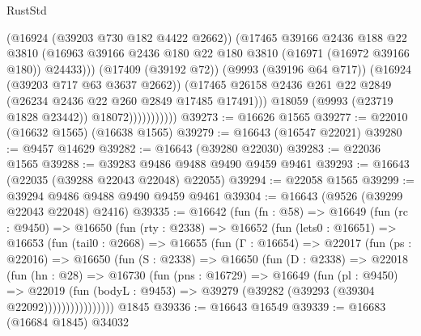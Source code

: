 \begin{lexlean}{RustStd}
\begin{coremodule}
                              (@16924 (@39203 @730 @182 @4422 @2662))
                              (@17465
                                @39166
                                @2436
                                @188
                                @22
                                @3810
                                (@16963
                                  @39166
                                  @2436
                                  @180
                                  @22
                                  @180
                                  @3810
                                  (@16971 (@16972 @39166 @180))
                                  @24433)))
                            (@17409 (@39192 @72))
                            (@9993 (@39196 @64 @717))
                            (@16924 (@39203 @717 @63 @3637 @2662))
                            (@17465
                              @26158
                              @2436
                              @261
                              @22
                              @2849
                              (@26234 @2436 @22 @260 @2849 @17485 @17491)))
                          @18059
                          (@9993 (@23719 @1828 @23442))
                          @18072)))))))))))
@39273 := @16626 @1565
@39277 := @22010 (@16632 @1565) (@16638 @1565)
@39279 := @16643 (@16547 @22021)
@39280 := @9457 @14629
@39282 := @16643 (@39280 @22030)
@39283 := @22036 @1565
@39288 := @39283 @9486 @9488 @9490 @9459 @9461
@39293 := @16643 (@22035 (@39288 @22043 @22048) @22055)
@39294 := @22058 @1565
@39299 := @39294 @9486 @9488 @9490 @9459 @9461
@39304 := @16643 (@9526 (@39299 @22043 @22048) @2416)
@39335 := @16642
    (fun (fn : @58) =>
    @16649
      (fun (rc : @9450) =>
      @16650
        (fun (rty : @2338) =>
        @16652
          (fun (lets0 : @16651) =>
          @16653
            (fun (tail0 : @2668) =>
            @16655
              (fun (Γ : @16654) =>
              @22017
                (fun (ps : @22016) =>
                @16650
                  (fun (S : @2338) =>
                  @16650
                    (fun (D : @2338) =>
                    @22018
                      (fun (hn : @28) =>
                      @16730
                        (fun (pns : @16729) =>
                        @16649
                          (fun (pl : @9450) =>
                          @22019
                            (fun (bodyL : @9453) =>
                            @39279 (@39282 (@39293 (@39304 @22092))))))))))))))))
    @1845
@39336 := @16643 @16549
@39339 := @16683 (@16684 @1845) @34032

\end{coremodule}
\end{lexlean}
